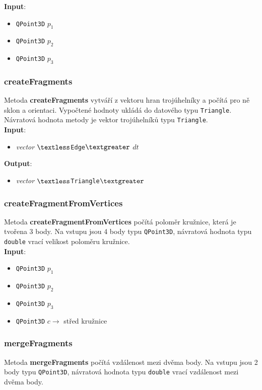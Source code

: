 \documentclass[a4paper, 12pt]{article}
\begin{document}
\textbf{Input}:
\begin{itemize}
\item \texttt{QPoint3D} $p_1$
\item \texttt{QPoint3D} $p_2$
\item \texttt{QPoint3D} $p_3$
\end{itemize}

\subsubsection*{createFragments}
Metoda \textbf{createFragments} vytváří z vektoru hran trojúhelníky a počítá pro ně sklon a orientaci. Vypočtené hodnoty ukládá do datového typu \texttt{Triangle}. Návratová hodnota metody je vektor trojúhelníků typu \texttt{Triangle}.\\

\textbf{Input}:
\begin{itemize}
\item \textsl{vector} $\textless$\texttt{Edge}$\textgreater$ $dt$
\end{itemize}

\textbf{Output}:
\begin{itemize}
\item \textsl{vector} $\textless$\texttt{Triangle}$\textgreater$
\end{itemize}



\subsubsection*{createFragmentFromVertices}
Metoda \textbf{createFragmentFromVertices} počítá poloměr kružnice, která je tvořena 3 body. Na vstupu jsou 4 body typu \texttt{QPoint3D}, návratová hodnota typu \texttt{double} vrací velikost poloměru kružnice.\\ 

\textbf{Input}:
\begin{itemize}
\item \texttt{QPoint3D} $p_1$ 
\item \texttt{QPoint3D} $p_2$ 
\item \texttt{QPoint3D} $p_3$
\item \texttt{QPoint3D} $c \rightarrow$ střed kružnice
\end{itemize}

\subsubsection*{mergeFragments}
Metoda \textbf{mergeFragments} počítá vzdálenost mezi dvěma body. Na vstupu jsou 2 body typu \texttt{QPoint3D}, návratová hodnota typu \texttt{double} vrací vzdálenost mezi dvěma body.\\ 
\end{document}
